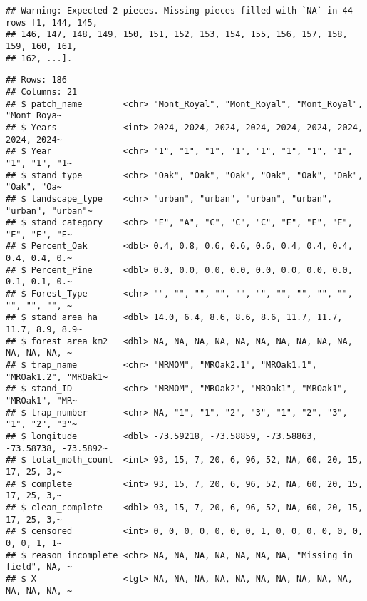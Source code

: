 \documentclass[
]{article}
\newenvironment{Shaded}{\begin{snugshade}}{\end{snugshade}}
\newcommand{\DocumentationTok}[1]{\textcolor[rgb]{0.56,0.35,0.01}{\textbf{\textit{#1}}}}
\newcommand{\FunctionTok}[1]{\textcolor[rgb]{0.13,0.29,0.53}{\textbf{#1}}}
\newcommand{\NormalTok}[1]{#1}
\newcommand{\SpecialCharTok}[1]{\textcolor[rgb]{0.81,0.36,0.00}{\textbf{#1}}}
\begin{document}
\begin{verbatim}
## Warning: Expected 2 pieces. Missing pieces filled with `NA` in 44 rows [1, 144, 145,
## 146, 147, 148, 149, 150, 151, 152, 153, 154, 155, 156, 157, 158, 159, 160, 161,
## 162, ...].
\end{verbatim}

\begin{verbatim}
## Rows: 186
## Columns: 21
## $ patch_name        <chr> "Mont_Royal", "Mont_Royal", "Mont_Royal", "Mont_Roya~
## $ Years             <int> 2024, 2024, 2024, 2024, 2024, 2024, 2024, 2024, 2024~
## $ Year              <chr> "1", "1", "1", "1", "1", "1", "1", "1", "1", "1", "1~
## $ stand_type        <chr> "Oak", "Oak", "Oak", "Oak", "Oak", "Oak", "Oak", "Oa~
## $ landscape_type    <chr> "urban", "urban", "urban", "urban", "urban", "urban"~
## $ stand_category    <chr> "E", "A", "C", "C", "C", "E", "E", "E", "E", "E", "E~
## $ Percent_Oak       <dbl> 0.4, 0.8, 0.6, 0.6, 0.6, 0.4, 0.4, 0.4, 0.4, 0.4, 0.~
## $ Percent_Pine      <dbl> 0.0, 0.0, 0.0, 0.0, 0.0, 0.0, 0.0, 0.0, 0.1, 0.1, 0.~
## $ Forest_Type       <chr> "", "", "", "", "", "", "", "", "", "", "", "", "", ~
## $ stand_area_ha     <dbl> 14.0, 6.4, 8.6, 8.6, 8.6, 11.7, 11.7, 11.7, 8.9, 8.9~
## $ forest_area_km2   <dbl> NA, NA, NA, NA, NA, NA, NA, NA, NA, NA, NA, NA, NA, ~
## $ trap_name         <chr> "MRMOM", "MROak2.1", "MROak1.1", "MROak1.2", "MROak1~
## $ stand_ID          <chr> "MRMOM", "MROak2", "MROak1", "MROak1", "MROak1", "MR~
## $ trap_number       <chr> NA, "1", "1", "2", "3", "1", "2", "3", "1", "2", "3"~
## $ longitude         <dbl> -73.59218, -73.58859, -73.58863, -73.58738, -73.5892~
## $ total_moth_count  <int> 93, 15, 7, 20, 6, 96, 52, NA, 60, 20, 15, 17, 25, 3,~
## $ complete          <int> 93, 15, 7, 20, 6, 96, 52, NA, 60, 20, 15, 17, 25, 3,~
## $ clean_complete    <dbl> 93, 15, 7, 20, 6, 96, 52, NA, 60, 20, 15, 17, 25, 3,~
## $ censored          <int> 0, 0, 0, 0, 0, 0, 0, 1, 0, 0, 0, 0, 0, 0, 0, 0, 1, 1~
## $ reason_incomplete <chr> NA, NA, NA, NA, NA, NA, NA, "Missing in field", NA, ~
## $ X                 <lgl> NA, NA, NA, NA, NA, NA, NA, NA, NA, NA, NA, NA, NA, ~
\end{verbatim}

\begin{Shaded}
\end{Shaded}
\end{document}

